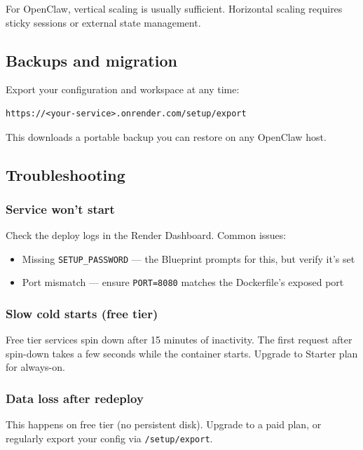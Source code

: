 For OpenClaw, vertical scaling is usually sufficient. Horizontal scaling requires sticky sessions or external state management.

\subsection{Backups and migration}


Export your configuration and workspace at any time:

\begin{lstlisting}
https://<your-service>.onrender.com/setup/export
\end{lstlisting}


This downloads a portable backup you can restore on any OpenClaw host.

\subsection{Troubleshooting}


\subsubsection{Service won't start}


Check the deploy logs in the Render Dashboard. Common issues:

\begin{itemize}
  \item Missing \texttt{SETUP\_PASSWORD} — the Blueprint prompts for this, but verify it's set
  \item Port mismatch — ensure \texttt{PORT=8080} matches the Dockerfile's exposed port
\end{itemize}


\subsubsection{Slow cold starts (free tier)}


Free tier services spin down after 15 minutes of inactivity. The first request after spin-down takes a few seconds while the container starts. Upgrade to Starter plan for always-on.

\subsubsection{Data loss after redeploy}


This happens on free tier (no persistent disk). Upgrade to a paid plan, or
regularly export your config via \texttt{/setup/export}.

